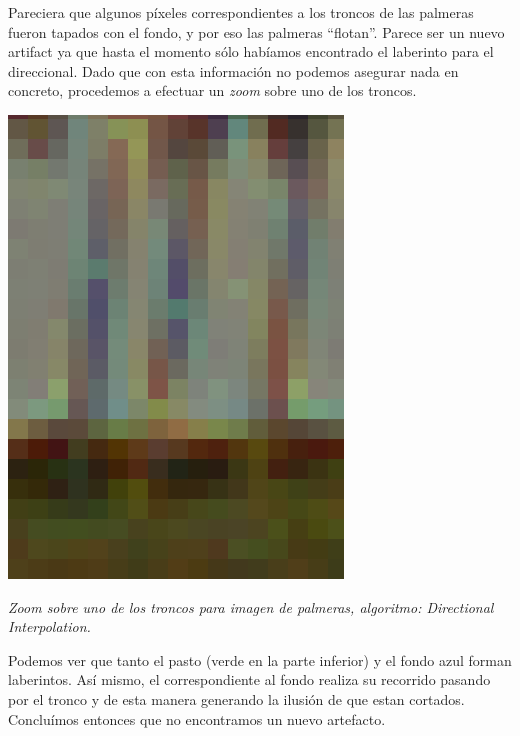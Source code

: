\vspace{\baselineskip}

Pareciera que algunos píxeles correspondientes a los troncos de las palmeras fueron tapados con el fondo, y por eso las palmeras ``flotan''. Parece ser un nuevo artifact ya que hasta el momento sólo habíamos encontrado el laberinto para el direccional. Dado que con esta información no podemos asegurar nada en concreto, procedemos a efectuar un \textit{zoom} sobre uno de los troncos.

\vspace{\baselineskip}

	\begin{center}
		\includegraphics[scale=.5]{../enunciado/images_files/cualitativo/palms_zoom_directional.png}
		\vspace{2pt}
		\par
		\footnotesize\textit{Zoom sobre uno de los troncos para imagen de palmeras, algoritmo: Directional Interpolation.}
	\end{center}

\vspace{\baselineskip}

Podemos ver que tanto el pasto (verde en la parte inferior) y el fondo azul forman laberintos. Así mismo, el correspondiente al fondo realiza su recorrido pasando por el tronco y de esta manera generando la ilusión de que estan cortados. Concluímos entonces que no encontramos un nuevo artefacto.

